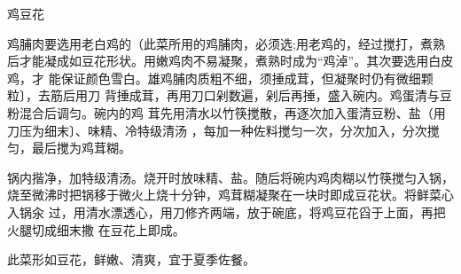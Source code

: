 \begin{recipe}{鸡豆花\footnotemark}

\ingredients


\cooking

\step 鸡脯肉要选用老白鸡的（此菜所用的鸡脯肉，必须选;用老鸡的，经过搅打，煮熟
后才能凝成如豆花形状。用嫩鸡肉不易凝聚，煮熟时成为“鸡淖”。其次要选用白皮鸡，才
能保证颜色雪白。雄鸡脯肉质粗不细，须捶成茸，但凝聚时仍有微细颗粒〕，去筋后用刀
背捶成茸，再用刀口剁数遍，剁后再捶，盛入碗内。鸡蛋清与豆粉混合后调匀。碗内的鸡
茸先用清水以竹筷搅散，再逐次加入蛋清豆粉、盐（用刀压为细末〕、味精、冷特级清汤
，每加一种佐料搅匀一次，分次加入，分次搅匀，最后搅为鸡茸糊。

\step 锅内揩净，加特级清汤。烧开时放味精、盐。随后将碗内鸡肉糊以竹筷搅匀入锅，
烧至微沸时把锅移于微火上烧十分钟，鸡茸糊凝聚在一块时即成豆花状。将鲜菜心入锅汆
过，用清水漂透心，用刀修齐两端，放于碗底，将鸡豆花舀于上面，再把火腿切成细末撒
在豆花上即成。

\features

此菜形如豆花，鲜嫩、清爽，宜于夏季佐餐。


\end{recipe}

